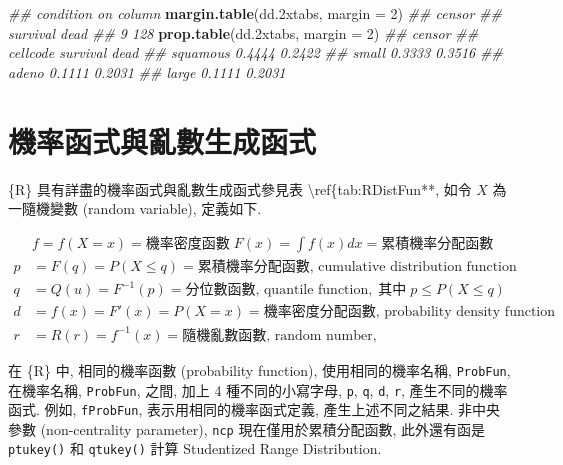 \documentclass[
]{book}
\newenvironment{Shaded}{\begin{snugshade}}{\end{snugshade}}
\newcommand{\CommentTok}[1]{\textcolor[rgb]{0.56,0.35,0.01}{\textit{#1}}}
\newcommand{\DataTypeTok}[1]{\textcolor[rgb]{0.13,0.29,0.53}{#1}}
\newcommand{\DecValTok}[1]{\textcolor[rgb]{0.00,0.00,0.81}{#1}}
\newcommand{\FloatTok}[1]{\textcolor[rgb]{0.00,0.00,0.81}{#1}}
\newcommand{\KeywordTok}[1]{\textcolor[rgb]{0.13,0.29,0.53}{\textbf{#1}}}
\newcommand{\NormalTok}[1]{#1}
\begin{document}
\begin{Shaded}
\begin{Highlighting}[]
\CommentTok{\#\# condition on column}
\KeywordTok{margin.table}\NormalTok{(dd}\FloatTok{.2}\NormalTok{xtabs, }\DataTypeTok{margin =} \DecValTok{2}\NormalTok{)}
\CommentTok{\#\# censor}
\CommentTok{\#\# survival     dead }
\CommentTok{\#\#        9      128}
\KeywordTok{prop.table}\NormalTok{(dd}\FloatTok{.2}\NormalTok{xtabs, }\DataTypeTok{margin =} \DecValTok{2}\NormalTok{)}
\CommentTok{\#\#           censor}
\CommentTok{\#\# cellcode   survival   dead}
\CommentTok{\#\#   squamous   0.4444 0.2422}
\CommentTok{\#\#   small      0.3333 0.3516}
\CommentTok{\#\#   adeno      0.1111 0.2031}
\CommentTok{\#\#   large      0.1111 0.2031}
\end{Highlighting}
\end{Shaded}

\hypertarget{ux6a5fux7387ux51fdux5f0fux8207ux4e82ux6578ux751fux6210ux51fdux5f0f}{%
\section{機率函式與亂數生成函式}\label{ux6a5fux7387ux51fdux5f0fux8207ux4e82ux6578ux751fux6210ux51fdux5f0f}}

\{R\} 具有詳盡的機率函式與亂數生成函式參見表 \textbackslash ref\{tab:RDistFun**, 如令 \(X\) 為一隨機變數 (random variable), 定義如下.

\[
\begin{aligned}
&  f = f(X = x) = \text{機率密度函數}\; F(x) = \int f(x) dx = \text{累積機率分配函數}\\
p &  =   F(q) = P (X \le q) = \text{累積機率分配函數, cumulative distribution function}  \\
q &  =   Q (u) = F^{-1} (p) = \text{分位數函數, quantile function}, \; \text{其中}\;  p \le P (X \le q) \\
d &  =  f(x) = F' (x) = P (X = x) = \text{機率密度分配函數, probability density function} \\
r &  =  R (r) = f^{-1} (x)  = \text{隨機亂數函數, random number}, 
\end{aligned}
\]

在 \{R\} 中, 相同的機率函數 (probability function), 使用相同的機率名稱,
\texttt{ProbFun},
在機率名稱, \texttt{ProbFun}, 之間,
加上 4 種不同的小寫字母, \texttt{p}, \texttt{q}, \texttt{d}, \texttt{r},
產生不同的機率函式.
例如, \texttt{fProbFun},
表示用相同的機率函式定義, 產生上述不同之結果.
非中央參數 (non-centrality parameter), \texttt{ncp} 現在僅用於累積分配函數,
此外還有函是 \texttt{ptukey()} 和 \texttt{qtukey()} 計算
Studentized Range Distribution.
\end{document}
